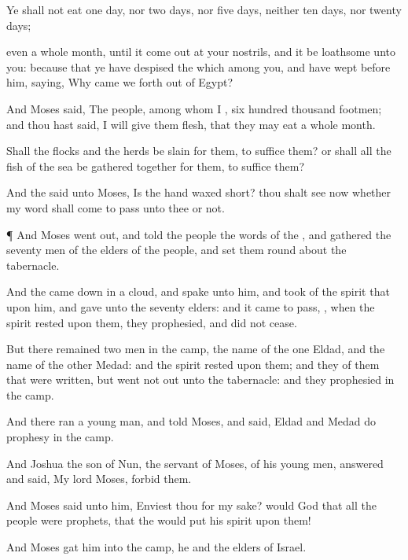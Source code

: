 {Ye shall not
eat
one
day, nor two
days, nor
five
days, neither
ten
days, nor
twenty
days;

 even a whole
month, until it come
out at your
nostrils, and it be
loathsome unto you:
because that ye have
despised the
{} which
{}
among you, and have
wept
before him,
saying, Why came we
forth out of
Egypt?

And
Moses
said, The
people,
among whom I
{},
{}
six
hundred
thousand
footmen; and thou hast
said, I will
give them
flesh, that they may
eat a
whole
month.

Shall the
flocks and the
herds be
slain for them, to
suffice them? or shall all the
fish of the
sea be gathered
together for them, to
suffice them?

And the
{}
said unto
Moses, Is the
{}
hand waxed
short? thou shalt
see now whether my
word shall come to
pass unto thee or not.


\par }{\PP {}¶ And
Moses went
out, and
told the
people the
words of the
{}, and
gathered the
seventy
men of the
elders of the
people, and
set them round
about the
tabernacle.

And the
{} came
down in a
cloud, and
spake unto him, and
took of the
spirit that
{} upon him, and
gave
{} unto the
seventy
elders: and it came to pass,
{}, when the
spirit
rested upon them, they
prophesied, and did not
cease.

But there
remained
two
{}
men in the
camp, the
name of the
one
{}
Eldad, and the
name of the
other
Medad: and the
spirit
rested upon them; and they
{} of them that were
written, but went not
out unto the
tabernacle: and they
prophesied in the
camp.

And there
ran a young
man, and
told
Moses, and
said,
Eldad and
Medad do
prophesy in the
camp.

And
Joshua the
son of
Nun, the
servant of
Moses,
{} of his young
men,
answered and
said, My
lord
Moses,
forbid them.

And
Moses
said unto him,
Enviest thou for my sake? would God that all
the
{}
people were
prophets,
{} that the
{} would
put his
spirit upon them!

And
Moses
gat him into the
camp, he and the
elders of
Israel.


}
